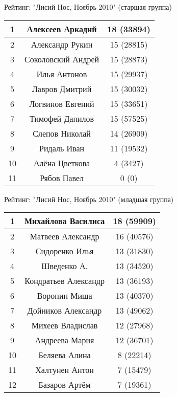 \documentclass[20pt]{article}
\begin{document}
Рейтинг: "Лисий Нос, Ноябрь 2010" (старшая группа)


\begin{tabular}{ | c | c | c | }
  \hline
  1 & Алексеев Аркадий & 18 (33894) \\ \hline 
  2 & Александр Рукин & 15 (28815) \\ \hline 
  3 & Соколовский Андрей & 15 (28873) \\ \hline 
  4 & Илья Антонов & 15 (29937) \\ \hline 
  5 & Лавров Дмитрий & 15 (30032) \\ \hline 
  6 & Логвинов Евгений & 15 (33651) \\ \hline 
  7 & Тимофей Данилов & 15 (57525) \\ \hline 
  8 & Слепов Николай & 14 (26909) \\ \hline 
  9 & Ридаль Иван & 11 (19532) \\ \hline 
  10 & Алёна Цветкова & 4 (3427) \\ \hline 
  11 & Рябов Павел & 0 (0) \\ \hline 
\end{tabular}


\vspace{30 mm}


Рейтинг: "Лисий Нос, Ноябрь 2010" (младшая группа)


\begin{tabular}{ | c | c | c | }
  \hline
  1 & Михайлова Василиса & 18 (59909) \\ \hline 
  2 & Матвеев Александр & 16 (40576) \\ \hline 
  3 & Сидоренко Илья & 13 (31830) \\ \hline 
  4 & Шведенко А. & 13 (34520) \\ \hline 
  5 & Кондратьев Александр & 13 (36193) \\ \hline 
  6 & Воронин Миша & 13 (40370) \\ \hline 
  7 & Дойников Александр & 13 (49062) \\ \hline 
  8 & Михеев Владислав & 12 (27968) \\ \hline 
  9 & Андреева Мария & 12 (36701) \\ \hline 
  10 & Беляева Алина & 8 (22214) \\ \hline 
  11 & Халтунен Антон & 7 (15479) \\ \hline 
  12 & Базаров Артём & 7 (19361) \\ \hline 
\end{tabular}
\end{document}
